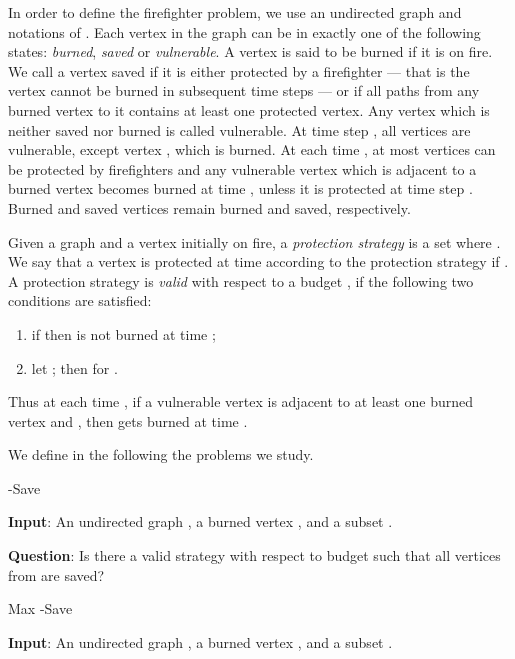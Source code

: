 \documentclass[10pt]{article}
\begin{document}
\medskip

In order to define the firefighter problem, we use an undirected graph
 and notations of \cite{anshelevich2009}. Each
 vertex in the graph can be in exactly one of the following states:
\textit{burned}, \textit{saved} or \textit{vulnerable}. 
A vertex is said to be burned if it is on fire.
We call a vertex saved if it is either protected by a firefighter --- that is the vertex cannot be burned in subsequent time steps --- or if all paths from any burned vertex to it contains at least one protected vertex.
Any vertex which is neither saved nor burned is called vulnerable.
At time step , all vertices are vulnerable, except vertex ,
which is burned. At each time , at most  vertices can be protected by firefighters and any vulnerable vertex  which is adjacent to a burned
vertex  becomes burned at time , unless it is protected at time step . Burned and saved vertices
remain burned and saved, respectively.

\medskip

Given a graph  and a vertex   initially on fire, a \textit{protection strategy} is a set  where  . We say
that a vertex  is protected at time  according to the
protection strategy  if . A protection
strategy is \textit{valid} with respect to a budget , if the
following two conditions are satisfied:

\begin{enumerate}
\item if  then  is not burned at time ;
\item let ; then  for .
\end{enumerate}





Thus at each time , if a vulnerable  vertex  is adjacent to at least one burned vertex and , then  gets burned at time .




\medskip
We define in the following the problems we study.

\medskip
\noindent
 {\sc -Save}

\noindent\textbf{Input}: An undirected graph , a burned vertex , and a subset .

\noindent\textbf{Question}: Is there a valid strategy
 with respect to budget  such that all vertices from  are saved?


\medskip
\noindent 
{\sc Max -Save}

\noindent\textbf{Input}: An undirected graph , a burned vertex , and a subset .
\end{document}
